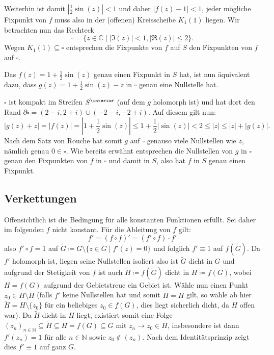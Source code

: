 \documentclass[a4paper]{article}
\begin{document}
Weiterhin ist damit $|\frac{1}{2} \sin(z)| < 1$ und daher $|f(z) - 1| < 1$, jeder mögliche Fixpunkt von $f$ muss also in der (offenen) Kreisscheibe $K_1(1)$ liegen.
Wir betrachten nun das Rechteck
\begin{equation*}
	\square = \{ z \in \mathds{C} \mid |\Im(z)|< 1, |\Re(z)| \leq 2\}\text{.}
\end{equation*}
Wegen $K_1(1) \subseteq \square$ entsprechen die Fixpunkte von $f$ auf $S$ den Fixpunkten von $f$ auf $\square$.

Das $f(z) = 1 + \frac{1}{2} \sin(z)$ genau einen Fixpunkt in $S$ hat, ist nun äquivalent dazu, dass $g(z) = 1 + \frac{1}{2} \sin(z) - z$ in $\square$ genau eine Nullstelle hat.


$\square$ ist kompakt im Streifen $S^\interior$ (auf dem $g$ holomorph ist) und hat dort den Rand $\partial \square = (2 - i, 2 + i) \cup (-2 - i, -2 + i)$. Auf diesem gilt nun:
\begin{equation*}
	|g(z) + z| = |f(z)| = |1 + \frac{1}{2} \sin(z)| \leq 1 + \frac{1}{2} | \sin(z)| < 2  \leq |z| \leq |z| + |g(z)|\text{.}
\end{equation*}
Nach dem Satz von Rouche hat somit $g$ auf $\square$ genauso viele Nullstellen wie $z$, nämlich genau $0 \in \square$.
Wie bereits erwähnt entsprechen die Nullstellen von $g$ in $\square$ genau den Fixpunkten von $f$ in $\square$ und damit in $S$, also hat $f$ in $S$ genau einen Fixpunkt.

\subsection{Verkettungen}

Offensichtlich ist die Bedingung für alle konstanten Funktionen erfüllt. Sei daher im folgenden $f$ nicht konstant.
Für die Ableitung von $f$ gilt:
\begin{equation*}
	f' = (f \circ f)' = (f' \circ f) \cdot f'
\end{equation*}
also $f' \circ f = 1$ auf $\tilde{G} \coloneq G \setminus \{ z \in G \mid f'(z) = 0\}$ und folglich $f' \equiv 1$ auf $f(\tilde{G})$.
Da $f'$ holomorph ist, liegen seine Nullstellen isoliert also ist $\tilde{G}$ dicht in $G$  und aufgrund der Stetigkeit von $f$ ist auch $\tilde{H} \coloneq f(\tilde{G})$ dicht in $H  \coloneq f(G)$, wobei $H = f(G)$ aufgrund der Gebietstreue ein Gebiet ist.
Wähle nun einen Punkt $z_0 \in H \setminus \tilde{H}$ (falls $f'$ keine Nullstellen hat und somit $\tilde{H} = H$ gilt, so wähle ab hier $\tilde{H} = H \setminus \{z_0\}$ für ein beliebiges $z_0 \in f(G)$, dies liegt sicherlich dicht, da $H$ offen war).
Da $\tilde{H}$ dicht in $H$ liegt, existiert somit eine Folge $(z_n)_{n \in \mathds{N}}\subseteq \tilde{H} \subseteq H = f(G) \subseteq G$ mit $z_n \to z_0 \in H$, insbesondere ist dann $f'(z_n) = 1$ für alle $n \in \mathds{N}$ sowie $z_0 \notin (z_n)$.
Nach dem Identitätsprinzip zeigt dies $f' \equiv 1$ auf ganz $G$.
\end{document}
